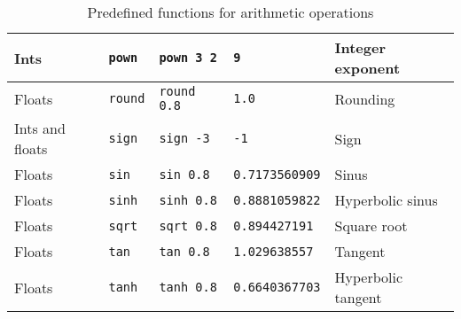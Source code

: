 \begin{table}
\begin{tabular}{|l|l|l|l|l|}
    \hline 
    Ints & \lstinline!pown! & \lstinline!pown 3 2! & \lstinline!9! & Integer exponent\\
    \hline 
    Floats & \lstinline!round! & \lstinline!round 0.8! & \lstinline!1.0! & Rounding\\
    \hline 
    Ints and floats & \lstinline!sign! & \lstinline!sign -3! & \lstinline!-1! & Sign\\
    \hline 
    Floats & \lstinline!sin! & \lstinline!sin 0.8! & \lstinline!0.7173560909! & Sinus\\
    \hline 
    Floats & \lstinline!sinh! & \lstinline!sinh 0.8! & \lstinline!0.8881059822! & Hyperbolic sinus\\
    \hline 
    Floats & \lstinline!sqrt! & \lstinline!sqrt 0.8! & \lstinline!0.894427191! & Square root\\
    \hline 
    Floats & \lstinline!tan! & \lstinline!tan 0.8! & \lstinline!1.029638557! & Tangent\\
    \hline 
    Floats & \lstinline!tanh! & \lstinline!tanh 0.8! & \lstinline!0.6640367703! & Hyperbolic tangent\\
    \hline 
  \end{tabular}
  \caption{Predefined functions for arithmetic operations}
  \label{tab:arithmeticFunctions}
\end{table}

